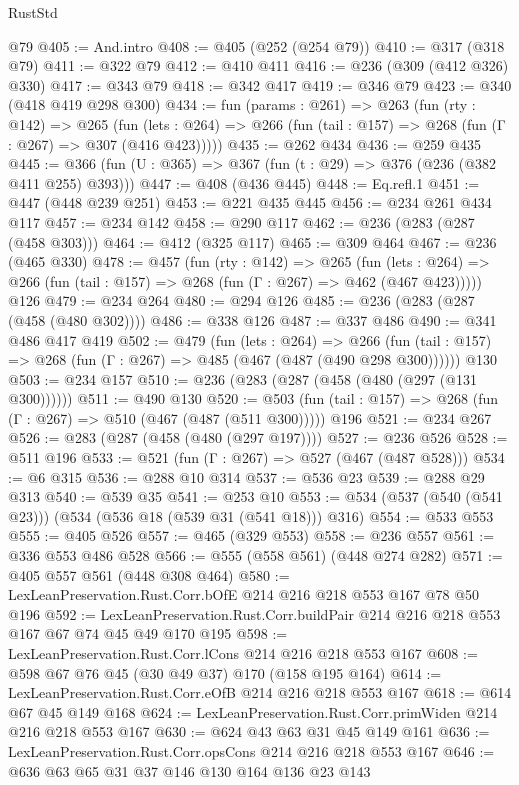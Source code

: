 \begin{lexlean}{RustStd}
\begin{coremodule}
{\begin{coremodule}
{{{{{    @79
@405 := And.intro
@408 := @405 (@252 (@254 @79))
@410 := @317 (@318 @79)
@411 := @322 @79
@412 := @410 @411
@416 := @236 (@309 (@412 @326) @330)
@417 := @343 @79
@418 := @342 @417
@419 := @346 @79
@423 := @340 (@418 @419 @298 @300)
@434 := fun (params : @261) =>
  @263
    (fun (rty : @142) =>
    @265
      (fun (lets : @264) => @266 (fun (tail : @157) => @268 (fun (Γ : @267) => @307 (@416 @423)))))
@435 := @262 @434
@436 := @259 @435
@445 := @366 (fun (U : @365) => @367 (fun (t : @29) => @376 (@236 (@382 @411 @255) @393)))
@447 := @408 (@436 @445)
@448 := Eq.refl.{1}
@451 := @447 (@448 @239 @251)
@453 := @221 @435 @445
@456 := @234 @261 @434 @117
@457 := @234 @142
@458 := @290 @117
@462 := @236 (@283 (@287 (@458 @303)))
@464 := @412 (@325 @117)
@465 := @309 @464
@467 := @236 (@465 @330)
@478 := @457
    (fun (rty : @142) =>
    @265
      (fun (lets : @264) => @266 (fun (tail : @157) => @268 (fun (Γ : @267) => @462 (@467 @423)))))
    @126
@479 := @234 @264
@480 := @294 @126
@485 := @236 (@283 (@287 (@458 (@480 @302))))
@486 := @338 @126
@487 := @337 @486
@490 := @341 @486 @417 @419
@502 := @479
    (fun (lets : @264) =>
    @266 (fun (tail : @157) => @268 (fun (Γ : @267) => @485 (@467 (@487 (@490 @298 @300))))))
    @130
@503 := @234 @157
@510 := @236 (@283 (@287 (@458 (@480 (@297 (@131 @300))))))
@511 := @490 @130
@520 := @503 (fun (tail : @157) => @268 (fun (Γ : @267) => @510 (@467 (@487 (@511 @300))))) @196
@521 := @234 @267
@526 := @283 (@287 (@458 (@480 (@297 @197))))
@527 := @236 @526
@528 := @511 @196
@533 := @521 (fun (Γ : @267) => @527 (@467 (@487 @528)))
@534 := @6 @315
@536 := @288 @10 @314
@537 := @536 @23
@539 := @288 @29 @313
@540 := @539 @35
@541 := @253 @10
@553 := @534 (@537 (@540 (@541 @23))) (@534 (@536 @18 (@539 @31 (@541 @18))) @316)
@554 := @533 @553
@555 := @405 @526
@557 := @465 (@329 @553)
@558 := @236 @557
@561 := @336 @553 @486 @528
@566 := @555 (@558 @561) (@448 @274 @282)
@571 := @405 @557 @561 (@448 @308 @464)
@580 := LexLeanPreservation.Rust.Corr.bOfE @214 @216 @218 @553 @167 @78 @50 @196
@592 := LexLeanPreservation.Rust.Corr.buildPair @214 @216 @218 @553 @167 @67 @74 @45 @49 @170 @195
@598 := LexLeanPreservation.Rust.Corr.lCons @214 @216 @218 @553 @167
@608 := @598 @67 @76 @45 (@30 @49 @37) @170 (@158 @195 @164)
@614 := LexLeanPreservation.Rust.Corr.eOfB @214 @216 @218 @553 @167
@618 := @614 @67 @45 @149 @168
@624 := LexLeanPreservation.Rust.Corr.primWiden @214 @216 @218 @553 @167
@630 := @624 @43 @63 @31 @45 @149 @161
@636 := LexLeanPreservation.Rust.Corr.opsCons @214 @216 @218 @553 @167
@646 := @636 @63 @65 @31 @37 @146 @130 @164 @136 @23 @143
}}}}}
\end{coremodule}}
\end{coremodule}
\end{lexlean}
